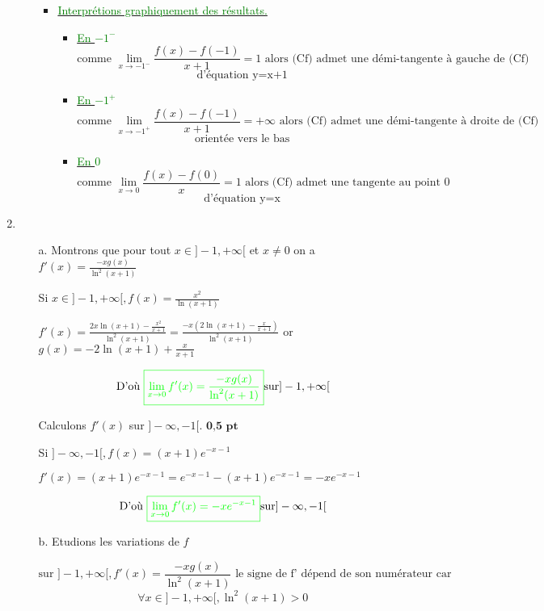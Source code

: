 \documentclass[12pt]{article}
\begin{document}
\begin{enumerate}
\begin{enumerate}
\begin{itemize}
\item \underline{\textcolor{green}{Interprétions graphiquement des résultats.}}

\begin{itemize}
\item \underline{\textcolor{green}{En $-1^{-}$}}
\[\text{comme } \lim_{x \to -1^{-}} \frac{f(x)-f(-1)}{x+1}=1 \text{ alors (Cf) admet une démi-tangente à gauche de (Cf)} \]
\[\text{d'équation y=x+1} \]
\item \underline{\textcolor{green}{En $-1^{+}$}}
\[\text{comme } \lim_{x \to -1^{+}} \frac{f(x)-f(-1)}{x+1}=+\infty \text{ alors (Cf) admet une démi-tangente à droite de (Cf)} \]
\[\text{orientée vers le bas} \]
\item \underline{\textcolor{green}{En $0$}}
\[\text{comme } \lim_{x \to 0} \frac{f(x)-f(0)}{x}=1 \text{ alors (Cf) admet une tangente au point 0 } \]
\[\text{d'équation y=x} \]
\end{itemize}

\end{itemize}
\end{enumerate}
\item
\begin{enumerate}
\item[a.] Montrons que pour tout $x \in ]-1, +\infty[$ et $x\neq 0$ on a $f'(x)=\frac{-xg(x)}{\ln^{2}(x+1)}$

Si $x \in ]-1, +\infty[, f(x)=\frac{x^{2}}{\ln(x+1)}$

$f'(x)=\frac{2x\ln(x+1)-\frac{x^{2}}{x+1}}{\ln^{2}(x+1)}=\frac{-x\left( 2\ln(x+1)-\frac{x}{x+1}\right) }{\ln^{2}(x+1)}$ or $g(x)=-2\ln(x+1)+\frac{x}{x+1}$

\[\text{D'où  }\textcolor{green}{ \boxed{ \lim_{x \to 0}f'(x)=\frac{-xg(x)}{\ln^{2}(x+1)} } } \text{sur} ]-1, +\infty[\]

Calculons $f'(x)$ sur $]-\infty, -1[$. $\textbf{0,5 pt}$

Si $]-\infty, -1[, f(x)=(x+1)e^{-x-1}$

$ f'(x)=(x+1)e^{-x-1}=e^{-x-1}-(x+1)e^{-x-1}=-xe^{-x-1} $

\[\text{D'où  }\textcolor{green}{ \boxed{ \lim_{x \to 0}f'(x)=-xe^{-x-1} } }\text{sur} ]-\infty, -1[\]

\item[b.] Etudions les variations de $f$ 

\[\text{sur } ]-1, +\infty[,f'(x)=\frac{-xg(x)}{\ln^{2}(x+1)} \text{ le signe de f' dépend de son numérateur car } \]
\[\forall x \in ]-1, +\infty[, \ln^{2}(x+1)>0\]


\end{enumerate}
\end{enumerate}
\end{document}
